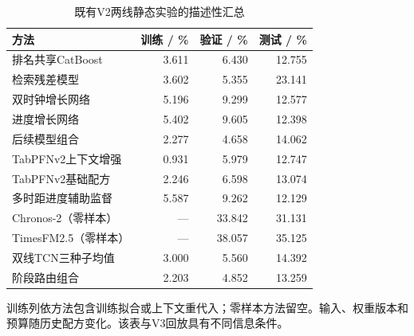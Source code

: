 \begin{table}[!htbp]\centering
\caption{既有V2两线静态实验的描述性汇总}\label{tab:historicalstatic}
\small\setlength{\tabcolsep}{4pt}\renewcommand{\arraystretch}{1.15}
\begin{tabularx}{\linewidth}{L r r r}\toprule
方法 & 训练 / \% & 验证 / \% & 测试 / \% \\
\midrule
排名共享CatBoost & 3.611 & 6.430 & 12.755 \\
检索残差模型 & 3.602 & 5.355 & 23.141 \\
双时钟增长网络 & 5.196 & 9.299 & 12.577 \\
进度增长网络 & 5.402 & 9.605 & 12.398 \\
后续模型组合 & 2.277 & 4.658 & 14.062 \\
TabPFNv2上下文增强 & 0.931 & 5.979 & 12.747 \\
TabPFNv2基础配方 & 2.246 & 6.598 & 13.074 \\
多时距进度辅助监督 & 5.587 & 9.262 & 12.129 \\
Chronos-2（零样本） & — & 33.842 & 31.131 \\
TimesFM2.5（零样本） & — & 38.057 & 35.125 \\
双线TCN三种子均值 & 3.000 & 5.560 & 14.392 \\
阶段路由组合 & 2.203 & 4.852 & 13.259 \\
\bottomrule\end{tabularx}
\par\vspace{4pt}\begin{minipage}{\linewidth}\footnotesize 训练列依方法包含训练拟合或上下文重代入；零样本方法留空。输入、权重版本和预算随历史配方变化。该表与V3回放具有不同信息条件。\end{minipage}
\end{table}
